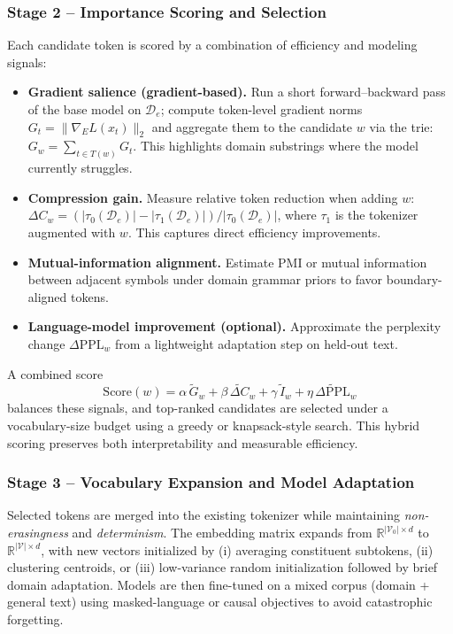 \subsubsection{Stage 2 – Importance Scoring and Selection}

Each candidate token is scored by a combination of efficiency and modeling signals:

\begin{itemize}
  \item \textbf{Gradient salience (gradient-based).}
  Run a short forward–backward pass of the base model on $\mathcal{D}_e$;
  compute token-level gradient norms $G_t\!=\!\|\nabla_E L(x_t)\|_2$ and aggregate them to the candidate $w$ via the trie: $G_w=\sum_{t\in T(w)}G_t$.
  This highlights domain substrings where the model currently struggles.

  \item \textbf{Compression gain.}
  Measure relative token reduction when adding $w$:
  $\Delta C_w=(|\tau_0(\mathcal{D}_e)|-|\tau_1(\mathcal{D}_e)|)/|\tau_0(\mathcal{D}_e)|$,
  where $\tau_1$ is the tokenizer augmented with $w$.
  This captures direct efficiency improvements.

  \item \textbf{Mutual-information alignment.}
  Estimate PMI or mutual information between adjacent symbols under domain grammar priors to favor boundary-aligned tokens.

  \item \textbf{Language-model improvement (optional).}
  Approximate the perplexity change $\Delta\mathrm{PPL}_w$ from a lightweight adaptation step on held-out text.
\end{itemize}

A combined score
\[
\mathrm{Score}(w)=\alpha\,\widetilde{G}_w+\beta\,\widetilde{\Delta C}_w+\gamma\,\widetilde{I}_w+\eta\,\widetilde{\Delta\mathrm{PPL}}_w
\]
balances these signals, and top-ranked candidates are selected under a vocabulary-size budget using a greedy or knapsack-style search.
This hybrid scoring preserves both interpretability and measurable efficiency.

\subsubsection{Stage 3 – Vocabulary Expansion and Model Adaptation}

Selected tokens are merged into the existing tokenizer while maintaining \emph{non-erasingness} and \emph{determinism}.
The embedding matrix expands from $\mathbb{R}^{|\mathcal{V}_0|\times d}$ to $\mathbb{R}^{|\mathcal{V}|\times d}$,
with new vectors initialized by (i) averaging constituent subtokens, (ii) clustering centroids, or (iii) low-variance random initialization followed by brief domain adaptation.
Models are then fine-tuned on a mixed corpus (domain + general text) using masked-language or causal objectives to avoid catastrophic forgetting.

